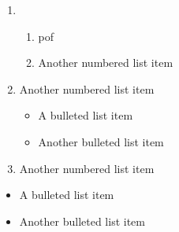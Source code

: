\begin{enumerate}
    \item \begin{enumerate}
    \item pof
    \item Another numbered list item
\end{enumerate}
    \item Another numbered list item
    \begin{itemize}
    \item A bulleted list item
    \item Another bulleted list item
\end{itemize}
\item Another numbered list item
\end{enumerate}

\begin{itemize}
    \item A bulleted list item
    \item Another bulleted list item
\end{itemize}